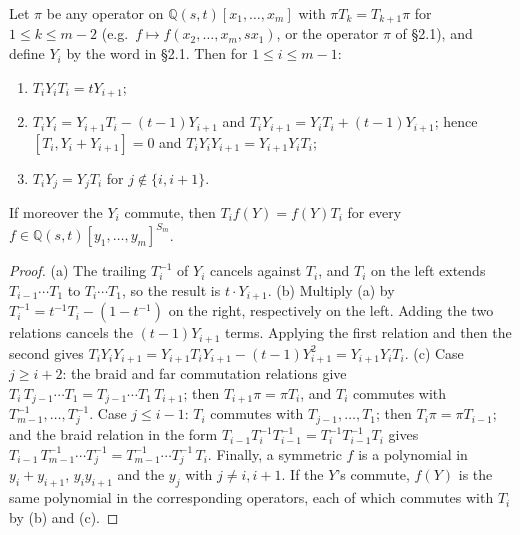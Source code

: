 \begin{lemma}\label{lem:bernstein}
Let $\pi$ be any operator on $\mathbb{Q}(s,t)[x_1,\dots,x_m]$ with $\pi T_k=T_{k+1}\pi$ for $1\le k\le m-2$
(e.g.\ $f\mapsto f(x_2,\dots,x_m,sx_1)$, or the operator $\pi$ of \S2.1), and define $Y_i$ by the word in \S2.1. Then for $1\le i\le m-1$:
\begin{enumerate}
\item[(a)] $T_iY_iT_i=tY_{i+1}$;
\item[(b)] $T_iY_i=Y_{i+1}T_i-(t-1)Y_{i+1}$ and $T_iY_{i+1}=Y_iT_i+(t-1)Y_{i+1}$; hence $[T_i,Y_i+Y_{i+1}]=0$ and $T_iY_iY_{i+1}=Y_{i+1}Y_iT_i$;
\item[(c)] $T_iY_j=Y_jT_i$ for $j\notin\{i,i+1\}$.
\end{enumerate}
If moreover the $Y_i$ commute, then $T_if(Y)=f(Y)T_i$ for every $f\in\mathbb{Q}(s,t)[y_1,\dots,y_m]^{S_m}$.
\end{lemma}
\begin{proof}
(a) The trailing $T_i^{-1}$ of $Y_i$ cancels against $T_i$, and $T_i$ on the left extends $T_{i-1}\cdots T_1$ to $T_i\cdots T_1$, so the result is $t\cdot Y_{i+1}$.
(b) Multiply (a) by $T_i^{-1}=t^{-1}T_i-(1-t^{-1})$ on the right, respectively on the left. Adding the two relations cancels the $(t-1)Y_{i+1}$ terms. Applying the first relation and then the second gives
$T_iY_iY_{i+1}=Y_{i+1}T_iY_{i+1}-(t-1)Y_{i+1}^2=Y_{i+1}Y_iT_i$.
(c) Case $j\ge i+2$: the braid and far commutation relations give $T_i\,T_{j-1}\cdots T_1=T_{j-1}\cdots T_1\,T_{i+1}$; then $T_{i+1}\pi=\pi T_i$, and $T_i$ commutes with $T_{m-1}^{-1},\dots,T_j^{-1}$.
Case $j\le i-1$: $T_i$ commutes with $T_{j-1},\dots,T_1$; then $T_i\pi=\pi T_{i-1}$; and the braid relation in the form $T_{i-1}T_i^{-1}T_{i-1}^{-1}=T_i^{-1}T_{i-1}^{-1}T_i$ gives $T_{i-1}\,T_{m-1}^{-1}\cdots T_j^{-1}=T_{m-1}^{-1}\cdots T_j^{-1}\,T_i$.
Finally, a symmetric $f$ is a polynomial in $y_i+y_{i+1}$, $y_iy_{i+1}$ and the $y_j$ with $j\ne i,i+1$. If the $Y$'s commute, $f(Y)$ is the same polynomial in the corresponding operators, each of which commutes with $T_i$ by (b) and (c).
\end{proof}
